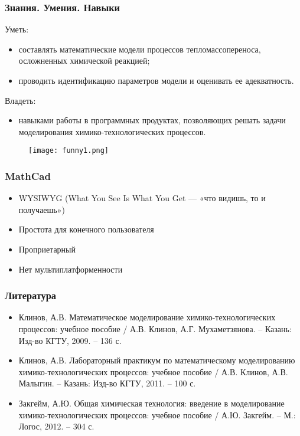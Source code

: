\begin{frame}
	\frametitle{Знания. Умения. Навыки}
	Уметь:
	\begin{itemize}
		\item составлять математические модели процессов тепломассопереноса, осложненных химической реакцией;
		\item проводить идентификацию параметров модели и оценивать ее адекватность.
	\end{itemize}
	Владеть:
	\begin{itemize}
		\item навыками работы в программных продуктах, позволяющих решать задачи моделирования химико-технологических процессов.
	\end{itemize}
\end{frame}

\begin{frame}
	\begin{figure}[h]
		\texttt{[image: funny1.png]}
	\end{figure}
\end{frame}

\begin{frame}
	\frametitle{MathCad}
	\begin{itemize}
		\item WYSIWYG (What You See Is What You Get — «что видишь, то и получаешь»)
		\item Простота для конечного пользователя
		\item Проприетарный
		\item Нет мультиплатформенности
	\end{itemize}
	
\end{frame}

\begin{frame}
	\frametitle{Литература}
	\begin{itemize}
		\item Клинов, А.В. Математическое моделирование химико-технологических процессов: учебное пособие / А.В. Клинов, А.Г. Мухаметзянова. – Казань: Изд-во КГТУ, 2009. – 136 с.
		\item Клинов, А.В. Лабораторный практикум по математическому моделированию химико-технологических процессов: учебное пособие / А.В. Клинов, А.В. Малыгин. – Казань: Изд-во КГТУ, 2011. – 100 с.
		\item Закгейм, А.Ю. Общая химическая технология: введение в моделирование химико-технологических процессов: учебное пособие / А.Ю. Закгейм. – М.: Логос, 2012. – 304 с.
	\end{itemize}
\end{frame}

